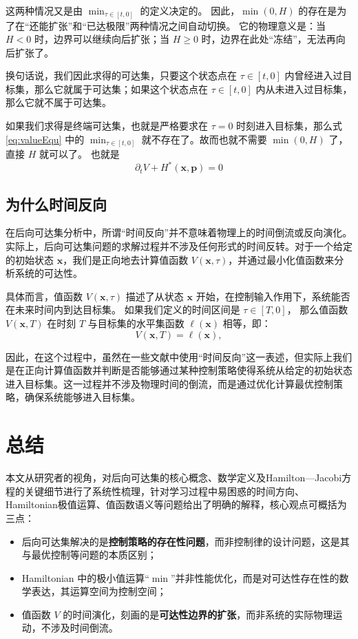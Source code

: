 \documentclass[11pt]{ctexrep}
\begin{document}
这两种情况又是由 $\min_{\tau \in [t,0]}$ 的定义决定的。
因此，$\min(0,H)$ 的存在是为了在“还能扩张”和“已达极限”两种情况之间自动切换。
它的物理意义是：当 $H < 0$ 时，边界可以继续向后扩张；当 $H \ge 0$ 时，边界在此处“冻结”，无法再向后扩张了。

换句话说，我们因此求得的可达集，只要这个状态点在 $\tau \in [t,0]$ 内曾经进入过目标集，那么它就属于可达集；如果这个状态点在 $\tau \in [t,0]$ 内从未进入过目标集，那么它就不属于可达集。

如果我们求得是终端可达集，也就是严格要求在 $\tau=0$ 时刻进入目标集，那么式 \ref{eq:valueEqu} 中的 $\min_{\tau \in [t,0]}$ 就不存在了。故而也就不需要 $\min(0,H)$ 了，直接 $H$ 就可以了。
也就是
\begin{equation*}
    \partial_t V + H^*(\mathbf{x},\mathbf{p}) = 0   
\end{equation*}



\subsection{为什么时间反向}
在后向可达集分析中，所谓“时间反向”并不意味着物理上的时间倒流或反向演化。实际上，后向可达集问题的求解过程并不涉及任何形式的时间反转。对于一个给定的初始状态 \(\mathbf{x}\)，我们是正向地去计算值函数 \(V(\mathbf{x}, \tau)\)，并通过最小化值函数来分析系统的可达性。

具体而言，值函数 \(V(\mathbf{x}, \tau)\) 描述了从状态 \(\mathbf{x}\) 开始，在控制输入作用下，系统能否在未来时间内到达目标集。
如果我们定义的时间区间是 $\tau \in [T,0]$， 那么值函数 \(V(\mathbf{x}, T)\) 在时刻 \(T\) 与目标集的水平集函数 \(\ell(\mathbf{x})\) 相等，即：
\[
V(\mathbf{x}, T) = \ell(\mathbf{x}),
\]

因此，在这个过程中，虽然在一些文献中使用“时间反向”这一表述，但实际上我们是在正向计算值函数并判断是否能够通过某种控制策略使得系统从给定的初始状态进入目标集。这一过程并不涉及物理时间的倒流，而是通过优化计算最优控制策略，确保系统能够进入目标集。
\section{总结}
本文从研究者的视角，对后向可达集的核心概念、数学定义及Hamilton---Jacobi方程的关键细节进行了系统性梳理，针对学习过程中易困惑的时间方向、Hamiltonian极值运算、值函数语义等问题给出了明确的解释，核心观点可概括为三点：
\begin{itemize}
    \item 后向可达集解决的是\textbf{控制策略的存在性问题}，而非控制律的设计问题，这是其与最优控制等问题的本质区别；
    \item Hamiltonian 中的极小值运算``$\min$''并非性能优化，而是对可达性存在性的数学表达，其运算空间为控制空间；
    \item 值函数 $V$ 的时间演化，刻画的是\textbf{可达性边界的扩张}，而非系统的实际物理运动，不涉及时间倒流。
\end{itemize}
\end{document}
